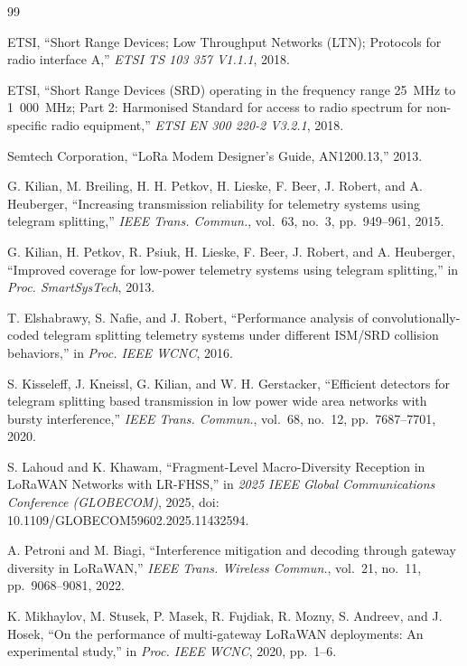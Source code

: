 \documentclass[journal]{IEEEtran}
\begin{document}
\begin{thebibliography}{99}

ETSI, ``Short Range Devices; Low Throughput Networks (LTN); Protocols for radio interface A,'' \emph{ETSI TS 103 357 V1.1.1}, 2018.

ETSI, ``Short Range Devices (SRD) operating in the frequency range 25~MHz to 1~000~MHz; Part 2: Harmonised Standard for access to radio spectrum for non-specific radio equipment,'' \emph{ETSI EN 300 220-2 V3.2.1}, 2018.

Semtech Corporation, ``LoRa Modem Designer's Guide, AN1200.13,'' 2013.

G. Kilian, M. Breiling, H. H. Petkov, H. Lieske, F. Beer, J. Robert, and A. Heuberger, ``Increasing transmission reliability for telemetry systems using telegram splitting,'' \emph{IEEE Trans. Commun.}, vol.\ 63, no.\ 3, pp.\ 949--961, 2015.

G. Kilian, H. Petkov, R. Psiuk, H. Lieske, F. Beer, J. Robert, and A. Heuberger, ``Improved coverage for low-power telemetry systems using telegram splitting,'' in \emph{Proc. SmartSysTech}, 2013.

T. Elshabrawy, S. Nafie, and J. Robert, ``Performance analysis of convolutionally-coded telegram splitting telemetry systems under different ISM/SRD collision behaviors,'' in \emph{Proc. IEEE WCNC}, 2016.

S. Kisseleff, J. Kneissl, G. Kilian, and W. H. Gerstacker, ``Efficient detectors for telegram splitting based transmission in low power wide area networks with bursty interference,'' \emph{IEEE Trans. Commun.}, vol.\ 68, no.\ 12, pp.\ 7687--7701, 2020.

S. Lahoud and K. Khawam, ``Fragment-Level Macro-Diversity Reception in LoRaWAN Networks with LR-FHSS,'' in \emph{2025 IEEE Global Communications Conference (GLOBECOM)}, 2025, doi: 10.1109/GLOBECOM59602.2025.11432594.

A. Petroni and M. Biagi, ``Interference mitigation and decoding through gateway diversity in LoRaWAN,'' \emph{IEEE Trans. Wireless Commun.}, vol.\ 21, no.\ 11, pp.\ 9068--9081, 2022.

K. Mikhaylov, M. Stusek, P. Masek, R. Fujdiak, R. Mozny, S. Andreev, and J. Hosek, ``On the performance of multi-gateway LoRaWAN deployments: An experimental study,'' in \emph{Proc. IEEE WCNC}, 2020, pp.\ 1--6.


\end{thebibliography}
\end{document}
